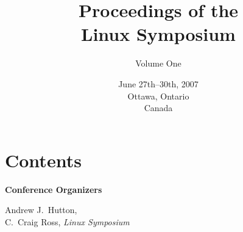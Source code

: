 \documentclass[twoside,12pt]{book}
\begin{document}
\frontmatter


\title{Proceedings of the\\
Linux Symposium}
\author{\vspace{1in}Volume One\vspace{3in}}
\date{June 27th--30th, 2007\\
 Ottawa, Ontario\\
 Canada}
\maketitle
\thispagestyle{empty}
\cleardoublepage


\section*{Contents}
\begin{raggedright}
\begin{list}{}{%
  \setlength{\rightmargin}{0pt}
  \setlength{\labelwidth}{0pt}
  \setlength{\labelsep}{0pt}
  \setlength{\topsep}{0pt}
  \setlength{\partopsep}{0pt}
  \setlength{\itemsep}{24pt plus6pt minus6pt}
  \setlength{\leftmargin}{2em}
  \setlength{\itemindent}{-\leftmargin}
  \setlength{\listparindent}{0pt}}



\end{list}
\end{raggedright}

\cleardoublepage


\vspace{2cm}

\textbf{{\Large Conference Organizers}}

\vspace{5mm}
\begin{large}
\begin{raggedright}
\hspace*{0.5in}Andrew J.\ Hutton, \\[1ex]
\hspace*{0.5in}C.\ Craig Ross, \hspace*{1ex}\textit{Linux Symposium}
\end{raggedright}
\end{large}
\end{document}
